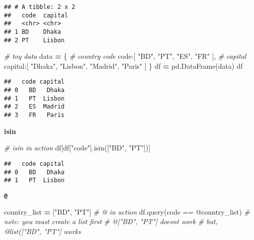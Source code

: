 \documentclass[
]{book}
\newenvironment{Shaded}{\begin{snugshade}}{\end{snugshade}}
\newcommand{\CommentTok}[1]{\textcolor[rgb]{0.56,0.35,0.01}{\textit{#1}}}
\newcommand{\NormalTok}[1]{#1}
\newcommand{\OperatorTok}[1]{\textcolor[rgb]{0.81,0.36,0.00}{\textbf{#1}}}
\newcommand{\StringTok}[1]{\textcolor[rgb]{0.31,0.60,0.02}{#1}}
\begin{document}
\begin{verbatim}
## # A tibble: 2 x 2
##   code  capital
##   <chr> <chr>  
## 1 BD    Dhaka  
## 2 PT    Lisbon
\end{verbatim}

\begin{Shaded}
\begin{Highlighting}[]
\CommentTok{\# toy data}
\NormalTok{data }\OperatorTok{=}\NormalTok{ \{}
    \CommentTok{\# country code}
    \StringTok{\textquotesingle{}code\textquotesingle{}}\NormalTok{:[}
        \StringTok{"BD"}\NormalTok{, }\StringTok{"PT"}\NormalTok{,}
        \StringTok{"ES"}\NormalTok{, }\StringTok{"FR"}
\NormalTok{    ],}
    \CommentTok{\# capital}
    \StringTok{\textquotesingle{}capital\textquotesingle{}}\NormalTok{:[}
        \StringTok{"Dhaka"}\NormalTok{, }\StringTok{"Lisbon"}\NormalTok{,}
        \StringTok{"Madrid"}\NormalTok{, }\StringTok{"Paris"}
\NormalTok{    ]}
\NormalTok{\}}
\NormalTok{df }\OperatorTok{=}\NormalTok{ pd.DataFrame(data)}
\NormalTok{df}
\end{Highlighting}
\end{Shaded}

\begin{verbatim}
##   code capital
## 0   BD   Dhaka
## 1   PT  Lisbon
## 2   ES  Madrid
## 3   FR   Paris
\end{verbatim}

\textbf{isin}

\begin{Shaded}
\begin{Highlighting}[]
\CommentTok{\# isin in action}
\NormalTok{df[df[}\StringTok{"code"}\NormalTok{].isin([}\StringTok{"BD"}\NormalTok{, }\StringTok{"PT"}\NormalTok{])]}
\end{Highlighting}
\end{Shaded}

\begin{verbatim}
##   code capital
## 0   BD   Dhaka
## 1   PT  Lisbon
\end{verbatim}

\textbf{\texttt{@}}

\begin{Shaded}
\begin{Highlighting}[]
\NormalTok{country\_list }\OperatorTok{=}\NormalTok{ [}\StringTok{"BD"}\NormalTok{, }\StringTok{"PT"}\NormalTok{]}
\CommentTok{\# @ in action}
\NormalTok{df.query(}\StringTok{\textquotesingle{}code == @country\_list\textquotesingle{}}\NormalTok{)}
\CommentTok{\# note: you must create a list first}
\CommentTok{\#   @["BD", "PT"] doesn\textquotesingle{}t work}
\CommentTok{\#   but, @list(["BD", "PT"] works}
\end{Highlighting}
\end{Shaded}
\end{document}
